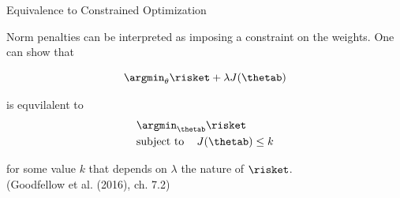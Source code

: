 \begin{frame}{Equivalence to Constrained Optimization}

Norm penalties can be interpreted as imposing a constraint on the weights. One can show that 

 $$\argmin_{\theta} \risket + \lambda \text{\(J(\thetab)\)}$$
 
 is equvilalent to
 \begin{align*}
 & \argmin_{\thetab}  \risket \\
  &\text{subject to \;\;\;}  J(\thetab) \leq k
 \end{align*}
 
 for some value $k$ that depends on $\lambda$ the nature of 
 $\risket$.\\[0.3cm]
 \scriptsize{(Goodfellow et al. (2016), ch. 7.2)}
\end{frame}

